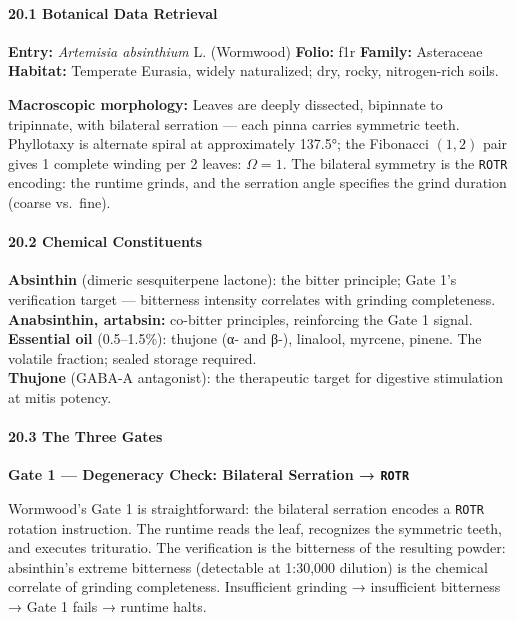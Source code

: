 \hypertarget{botanical-data-retrieval}{%
\paragraph{20.1 Botanical Data
Retrieval}\label{botanical-data-retrieval}}

\textbf{Entry:} \emph{Artemisia absinthium} L. (Wormwood)
\textbf{Folio:} f1r \textbf{Family:} Asteraceae \textbf{Habitat:}
Temperate Eurasia, widely naturalized; dry, rocky, nitrogen-rich soils.

\textbf{Macroscopic morphology:} Leaves are deeply dissected, bipinnate
to tripinnate, with bilateral serration --- each pinna carries symmetric
teeth. Phyllotaxy is alternate spiral at approximately 137.5°; the
Fibonacci \((1,2)\) pair gives 1 complete winding per 2 leaves:
\(\Omega = 1\). The bilateral symmetry is the \texttt{ROTR} encoding:
the runtime grinds, and the serration angle specifies the grind duration
(coarse vs.~fine).

\hypertarget{chemical-constituents}{%
\paragraph{20.2 Chemical Constituents}\label{chemical-constituents}}

\textbf{Absinthin} (dimeric sesquiterpene lactone): the bitter
principle; Gate 1's verification target --- bitterness intensity
correlates with grinding completeness.\\
\textbf{Anabsinthin, artabsin:} co-bitter principles, reinforcing the
Gate 1 signal.\\
\textbf{Essential oil} (0.5--1.5\%): thujone (α- and β-), linalool,
myrcene, pinene. The volatile fraction; sealed storage required.\\
\textbf{Thujone} (GABA-A antagonist): the therapeutic target for
digestive stimulation at mitis potency.

\hypertarget{the-three-gates}{%
\paragraph{20.3 The Three Gates}\label{the-three-gates}}

\textbf{Gate 1 --- Degeneracy Check: Bilateral Serration →
\texttt{ROTR}}

Wormwood's Gate 1 is straightforward: the bilateral serration encodes a
\texttt{ROTR} rotation instruction. The runtime reads the leaf,
recognizes the symmetric teeth, and executes trituratio. The
verification is the bitterness of the resulting powder: absinthin's
extreme bitterness (detectable at 1:30,000 dilution) is the chemical
correlate of grinding completeness. Insufficient grinding → insufficient
bitterness → Gate 1 fails → runtime halts.

